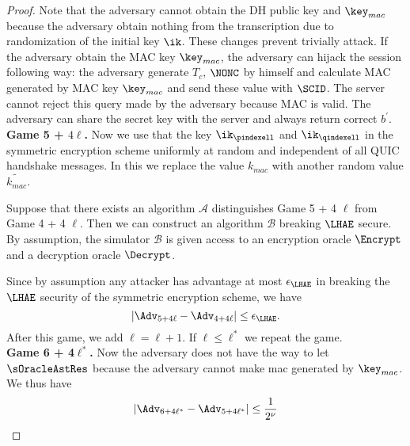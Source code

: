 \begin{proof}
 Note that the adversary cannot obtain the DH public key and $\key_{mac}$ because the adversary obtain nothing from the transcription due to randomization of the initial key $\ik$. These changes prevent trivially attack. If the adversary obtain the MAC key $\key_{mac}$, the adversary can hijack the session following way: the adversary generate $T_c$, $\NONC$ by himself and calculate MAC generated by MAC key $\key_{mac}$ and send these value with $\SCID$. The server cannot reject this query made by the adversary because MAC is valid. The adversary can share the secret key with the server and always return correct $b^{\prime}$.
\vspace{10pt}\\%
%
%
 \textbf{Game 5 + $4\ell$.} Now we use that the key $\ik_{\pindexell}$ and $\ik_{\qindexell}$ in the symmetric encryption scheme uniformly at random and independent of all QUIC handshake messages. In this we replace the value $k_{mac}$ with another random value $\widetilde{k_{mac}}$.

 Suppose that there exists an algorithm $\mathcal{A}$ distinguishes Game 5 + 4 $\ell$ from Game 4 + 4 $\ell$. Then we can construct an algorithm $\mathcal{B}$ breaking $\LHAE$ secure. By assumption, the simulator $\mathcal{B}$ is given access to an encryption oracle $\Encrypt$ and a decryption oracle $\Decrypt$.

 Since by assumption any attacker has advantage at most $\epsilon_{\LHAE}$ in breaking the $\LHAE$ security of the symmetric encryption scheme, we have
 \begin{equation}
  |\Adv_{5 + 4\ell} - \Adv_{4 + 4\ell}| \leq \epsilon_{\LHAE}.
 \end{equation}%
 After this game, we add $\ell = \ell + 1$. If $\ell \leq \ell^{\ast}$ we repeat the game.
\vspace{10pt}\\%
%
 \textbf{Game 6 + 4$\ell^{\ast}$.} Now the adversary does not have the way to let $\sOracleAstRes$ because the adversary cannot make mac generated by $\key_{mac}$. We thus have
 \begin{equation}
  |\Adv_{6 + 4\ell^{\ast}} - \Adv_{5 + 4\ell^{\ast}}| \leq \frac{1}{2^{\nu}}
 \end{equation}%
%
%
\end{proof}